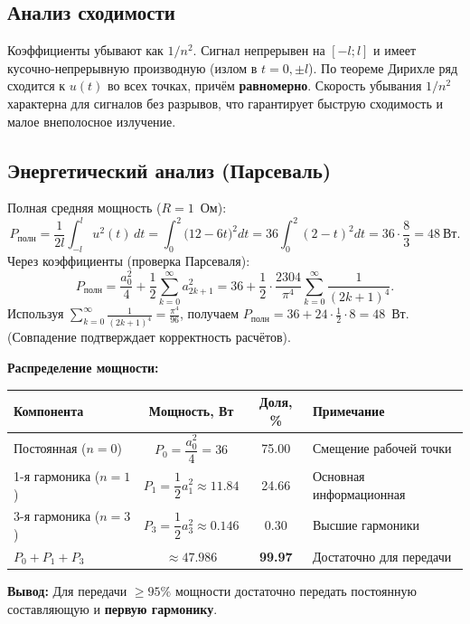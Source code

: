 \documentclass[a4paper,12pt]{article}
\begin{document}
\subsection{Анализ сходимости}
Коэффициенты убывают как $1/n^2$. Сигнал непрерывен на $[-l;l]$ и имеет кусочно-непрерывную производную (излом в $t=0, \pm l$). По теореме Дирихле ряд сходится к $u(t)$ во всех точках, причём \textbf{равномерно}. Скорость убывания $1/n^2$ характерна для сигналов без разрывов, что гарантирует быструю сходимость и малое внеполосное излучение.

\subsection{Энергетический анализ (Парсеваль)}
Полная средняя мощность ($R=1$~Ом):
\[
P_{\text{полн}} = \frac{1}{2l} \int_{-l}^l u^2(t) \, dt = \int_0^2 \bigl(12-6t\bigr)^2 dt = 36 \int_0^2 (2-t)^2 dt = 36 \cdot \frac{8}{3} = 48~\text{Вт}.
\]
Через коэффициенты (проверка Парсеваля):
\[
P_{\text{полн}} = \frac{a_0^2}{4} + \frac{1}{2}\sum_{k=0}^\infty a_{2k+1}^2 = 36 + \frac{1}{2} \cdot \frac{2304}{\pi^4} \sum_{k=0}^\infty \frac{1}{(2k+1)^4}.
\]
Используя $\displaystyle\sum_{k=0}^\infty \frac{1}{(2k+1)^4} = \frac{\pi^4}{96}$, получаем $P_{\text{полн}} = 36 + 24 \cdot \frac{1}{2} \cdot 8 = 48$~Вт. (Совпадение подтверждает корректность расчётов).

\medskip
\noindent\textbf{Распределение мощности:}
\begin{center}
\renewcommand{\arraystretch}{1.2}
\small
\begin{tabularx}{\textwidth}{@{}lccX@{}}
\toprule
\textbf{Компонента} & \textbf{Мощность, Вт} & \textbf{Доля, \%} & \textbf{Примечание} \\
\midrule
Постоянная ($n=0$) & $P_0 = \dfrac{a_0^2}{4} = 36$ & 75.00 & Смещение рабочей точки \\
1-я гармоника ($n=1$) & $P_1 = \dfrac{1}{2}a_1^2 \approx 11.84$ & 24.66 & Основная информационная \\
3-я гармоника ($n=3$) & $P_3 = \dfrac{1}{2}a_3^2 \approx 0.146$ & 0.30 & Высшие гармоники \\
\midrule
$P_0+P_1+P_3$ & $\approx 47.986$ & \textbf{99.97} & Достаточно для передачи \\
\bottomrule
\end{tabularx}
\end{center}

\noindent\textbf{Вывод:} Для передачи $\ge 95\%$ мощности достаточно передать постоянную составляющую и \textbf{первую гармонику}.
\end{document}
